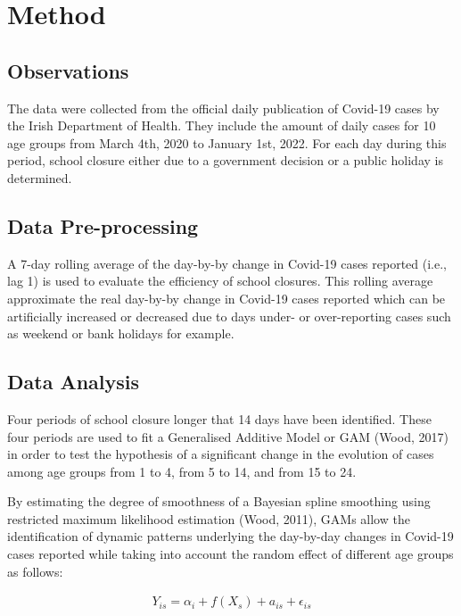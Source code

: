 \documentclass[]{elsarticle} %
\begin{document}
\hypertarget{method}{%
\section{Method}\label{method}}

\hypertarget{observations}{%
\subsection{Observations}\label{observations}}

The data were collected from the official daily publication of Covid-19
cases by the Irish Department of Health. They include the amount of
daily cases for 10 age groups from March 4th, 2020 to January 1st, 2022.
For each day during this period, school closure either due to a
government decision or a public holiday is determined.

\hypertarget{data-pre-processing}{%
\subsection{Data Pre-processing}\label{data-pre-processing}}

A 7-day rolling average of the day-by-by change in Covid-19 cases
reported (i.e., lag 1) is used to evaluate the efficiency of school
closures. This rolling average approximate the real day-by-by change in
Covid-19 cases reported which can be artificially increased or decreased
due to days under- or over-reporting cases such as weekend or bank
holidays for example.

\hypertarget{data-analysis}{%
\subsection{Data Analysis}\label{data-analysis}}

Four periods of school closure longer that 14 days have been identified.
These four periods are used to fit a Generalised Additive Model or GAM
(Wood, 2017) in order to test the hypothesis of a significant change in
the evolution of cases among age groups from 1 to 4, from 5 to 14, and
from 15 to 24.

By estimating the degree of smoothness of a Bayesian spline smoothing
using restricted maximum likelihood estimation (Wood, 2011), GAMs allow
the identification of dynamic patterns underlying the day-by-day changes
in Covid-19 cases reported while taking into account the random effect
of different age groups as follows:

\begin{align}
Y_{is} = \alpha_{i} + f(X_{s}) + a_{is} + \epsilon_{is}
\end{align}
\end{document}
